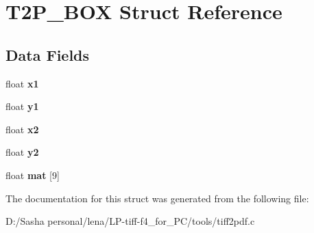 \hypertarget{struct_t2_p___b_o_x}{}\section{T2\+P\+\_\+\+B\+O\+X Struct Reference}
\label{struct_t2_p___b_o_x}
\subsection*{Data Fields}
\begin{DoxyCompactItemize}
\item 
\hypertarget{struct_t2_p___b_o_x_a3389d8b95846602e8f94cc15f41e48e9}{}float {\bfseries x1}\label{struct_t2_p___b_o_x_a3389d8b95846602e8f94cc15f41e48e9}

\item 
\hypertarget{struct_t2_p___b_o_x_a9fe80bf4738047a31d7c162807ed85f0}{}float {\bfseries y1}\label{struct_t2_p___b_o_x_a9fe80bf4738047a31d7c162807ed85f0}

\item 
\hypertarget{struct_t2_p___b_o_x_a24d6ffb6e8780eef0c81cd97e3f4fdaf}{}float {\bfseries x2}\label{struct_t2_p___b_o_x_a24d6ffb6e8780eef0c81cd97e3f4fdaf}

\item 
\hypertarget{struct_t2_p___b_o_x_a07bcd014e69eddcf4243b2a961014eaf}{}float {\bfseries y2}\label{struct_t2_p___b_o_x_a07bcd014e69eddcf4243b2a961014eaf}

\item 
\hypertarget{struct_t2_p___b_o_x_ac36a637f09a246708800300424dfac62}{}float {\bfseries mat} \mbox{[}9\mbox{]}\label{struct_t2_p___b_o_x_ac36a637f09a246708800300424dfac62}

\end{DoxyCompactItemize}


The documentation for this struct was generated from the following file\+:\begin{DoxyCompactItemize}
\item 
D\+:/\+Sasha personal/lena/\+L\+P-\/tiff-\/f4\+\_\+for\+\_\+\+P\+C/tools/tiff2pdf.\+c\end{DoxyCompactItemize}
